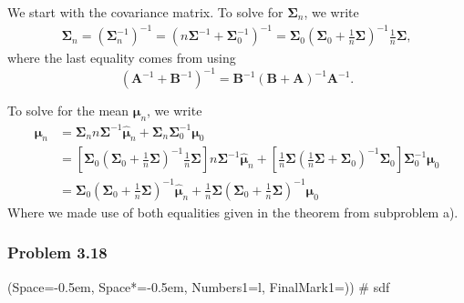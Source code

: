 \documentclass[12pt, a4paper]{article}
\newcommand{\listSpace}{-0.5em}%
\newcommand{\vect}[1]{\bm{#1}}
\begin{document}
\begin{easylist}[enumerate]
	We start with the covariance matrix. 
	To solve for $\vect{\Sigma}_n$, we write
	\begin{align*}
		\vect{\Sigma}_n = \left(\vect{\Sigma}_n^{-1}\right)^{-1} = \left(  n \vect{\Sigma}^{-1} + \vect{\Sigma}_0^{-1} \right)^{-1} = 
		\vect{\Sigma}_0 \left( \vect{\Sigma}_0 + \frac{1}{n}  \vect{\Sigma} \right)^{-1} \frac{1}{n} \vect{\Sigma},
	\end{align*}
	where the last equality comes from using 
	\begin{equation*}
		\left( \vect{A}^{-1} + \vect{B}^{-1}\right)^{-1} =
		\vect{B}^{-1} \left( \vect{B} + \vect{A} \right)^{-1} \vect{A}^{-1}.
	\end{equation*}
	
	To solve for the mean $\vect{\mu}_n$, we write
	\begin{align*}
		\vect{\mu}_n 
		&= \vect{\Sigma}_n n \vect{\Sigma}^{-1} \hat{\vect{\mu}}_n 
		+
		\vect{\Sigma}_n \vect{\Sigma}^{-1}_0  \vect{\mu}_0
		\\ &=
		\left[ \vect{\Sigma}_0 \left( \vect{\Sigma}_0 + \frac{1}{n}  \vect{\Sigma} \right)^{-1} \frac{1}{n} \vect{\Sigma} \right] n \vect{\Sigma}^{-1} \hat{\vect{\mu}}_n 
		+
		\left[  \frac{1}{n} \vect{\Sigma} \left(  \frac{1}{n}  \vect{\Sigma} + \vect{\Sigma}_0  \right)^{-1}  \vect{\Sigma}_0 \right] \vect{\Sigma}^{-1}_0  \vect{\mu}_0 \\
		& = 
		 \vect{\Sigma}_0 \left( \vect{\Sigma}_0 + \frac{1}{n}  \vect{\Sigma} \right)^{-1}  \hat{\vect{\mu}}_n 
		+
		 \frac{1}{n} \vect{\Sigma} \left( \vect{\Sigma}_0 + \frac{1}{n}  \vect{\Sigma}  \right)^{-1}   \vect{\mu}_0 
	\end{align*}
	Where we made use of both equalities given in the theorem from subproblem a).
	
\end{easylist}

\subsubsection*{Problem 3.18}
\begin{easylist}[enumerate]
	\ListProperties(Space=\listSpace, Space*=\listSpace, Numbers1=l, FinalMark1={)})
	# sdf
\end{easylist}
\end{document}
